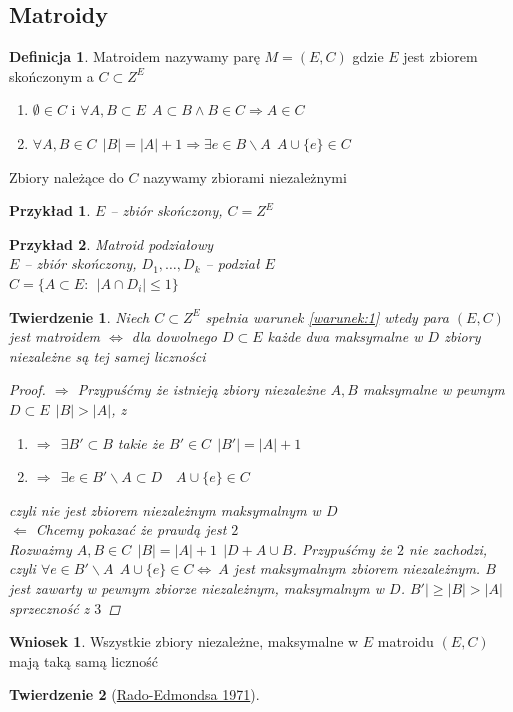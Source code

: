 \documentclass[12pt,a4paper]{article}
\newtheorem{tw}{Twierdzenie}
\newtheorem{przyklad}{Przykład}
\theoremstyle{definition}
\newtheorem{df}{Definicja}
\newtheorem{wniosek}{Wniosek}
\begin{document}


\subsection{Matroidy}
\begin{df}
Matroidem nazywamy parę $M = (E,C)$ gdzie $E$ jest zbiorem skończonym a $C\subset Z^E$
\begin{enumerate}
	\item $\emptyset\in C$ i $\forall A,B\subset E~~ A\subset B \wedge B\in C \Rightarrow A\in C$
	\item $\forall A,B\in C ~~ |B| = |A| +1 \Rightarrow \exists e\in B\smallsetminus A ~~ A\cup \{e\} \in C$
\end{enumerate}
Zbiory należące do $C$ nazywamy zbiorami niezależnymi
\end{df}
\begin{przyklad}
$E$ -- zbiór skończony, $C = Z^E$
\end{przyklad}
\begin{przyklad}
Matroid podziałowy\\
$E$ -- zbiór skończony, $D_1, \dots , D_k$ -- podział $E$\\
$C = \{A\subset E: ~~ |A\cap D_i| \leqslant 1\}$
\end{przyklad}



\begin{tw}
Niech $C\subset Z^E$ spełnia warunek \ref{warunek:1} wtedy para $(E,C)$ jest matroidem $\Leftrightarrow$ dla dowolnego $D\subset E$ każde dwa maksymalne w $D$ zbiory niezależne są tej samej liczności
\begin{proof}
$\Rightarrow$ Przypuśćmy że istnieją zbiory niezależne $A,B$ maksymalne w pewnym $D\subset E ~~ |B| > |A|$, z
\begin{enumerate}
	\item $\Rightarrow ~~ \exists B'\subset B$ takie  że $B'\in C ~~ |B'| = |A| + 1$
	\item $\Rightarrow ~~ \exists e\in B'\smallsetminus A \subset D \quad A\cup \{e\} \in C$
\end{enumerate}
czyli nie jest zbiorem niezależnym maksymalnym w $D$\\
$\Leftarrow$ Chcemy pokazać że prawdą jest $2$\\
Rozważmy $A,B\in C ~~ |B| = |A|+1 ~~ |D+A\cup B$. Przypuśćmy że $2$ nie zachodzi, czyli $\forall e\in B'\smallsetminus A~~ A\cup\{e\}\in C \Leftrightarrow ~A$ jest maksymalnym zbiorem niezależnym. $B$ jest zawarty w pewnym zbiorze niezależnym, maksymalnym w $D$. $B'| \geqslant |B| > |A|$ sprzeczność z $3$
\end{proof}
\end{tw}

\begin{wniosek}
Wszystkie zbiory niezależne, maksymalne w $E$ matroidu $(E,C)$ mają taką samą liczność
\end{wniosek}

\begin{tw}[\href{http://www.wmie.uz.zgora.pl/~edrgas/pliki/material\%20dla\%20zao\%20matroidy.pdf}{Rado-Edmondsa 1971}]
\end{tw}
\end{document}
